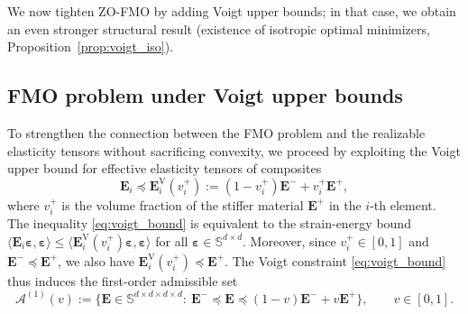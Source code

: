 \documentclass[preprint,3p]{elsarticle}
\newcommand{\tenss}[1]{\bm{\mathbf{#1}}}            %
\newcommand{\tensf}[1]{\bm{\mathbf{#1}}}            %
\newcommand{\strain}{\tenss{\varepsilon}}           %
\newcommand{\Ei}{\tensf{E}_i}                       %
\newcommand{\EV}{\tensf{E}_i^{\mathrm{V}}(v_i^+)}   %
\newcommand{\Emin}{\tensf{E}^{-}}                   %
\newcommand{\Emax}{\tensf{E}^{+}}                   %
\begin{document}
We now tighten ZO-FMO by adding Voigt upper bounds; in that case, we obtain an even stronger structural result (existence of isotropic optimal minimizers, Proposition~\ref{prop:voigt_iso}).

\subsection{FMO problem under Voigt upper bounds}\label{sec:fmo_voigt}

To strengthen the connection between the FMO problem and the realizable elasticity tensors without sacrificing convexity, we proceed by exploiting the Voigt upper bound \citep{Hill1963} for effective elasticity tensors of composites
%
\begin{equation}\label{eq:voigt_bound}
    \Ei \preceq \EV := (1-v_i^+) \Emin + v_i^+ \Emax,
\end{equation}
%
where $v_i^+$ is the volume fraction of the stiffer material $\Emax$ in the $i$-th element. The inequality \eqref{eq:voigt_bound} is equivalent to the strain-energy bound $\langle \Ei\strain,\strain\rangle \le \langle \EV \strain,\strain\rangle$ for all $\strain\in\mathbb{S}^{d\times d}$. Moreover, since $v_i^+\in[0,1]$ and $\Emin\preceq \Emax$, we also have $\EV\preceq \Emax$. The Voigt constraint \eqref{eq:voigt_bound} thus induces the first-order admissible set 
%
\begin{equation}\label{eq:A1_def}
\mathcal A^{(1)}(v)
:=\Big\{\tensf E\in\mathbb{S}^{d\times d\times d\times d}:\ \Emin \preceq \tensf E \preceq (1-v)\Emin + v\Emax\Big\},\qquad v\in[0,1].
\end{equation}
\end{document}
